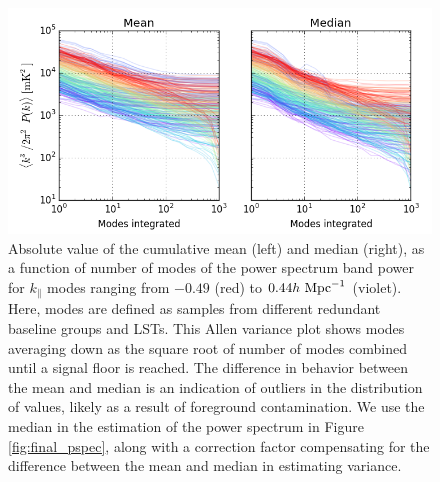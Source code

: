 \documentclass[twocolumn,numberedappendix]{emulateapj} \shorttitle{New Limits on the 21 cm Power Spectrum at $z=8.4$}
\newcommand{\hMpci}{h\ {\rm Mpc}^{-1}}
\begin{document}
\begin{figure}\centering
\includegraphics[width=1.8\columnwidth]{plots/pspec_variance.png}
\caption{
Absolute value of the cumulative mean (left) and median (right), as a function of number of modes 
of the power spectrum band power for
$k_\parallel$ modes ranging from $-0.49$ (red) to $0.44\hMpci$ (violet).
Here, modes are defined as samples from different redundant baseline groups and LSTs.
This Allen variance plot shows modes averaging down as the square root of
number of modes combined until a signal floor is reached.  The difference in
behavior between the mean and median is an indication of outliers
in the distribution of values, likely as a result of foreground contamination.
We use the median in the estimation of the power spectrum in Figure \ref{fig:final_pspec},
along with a correction factor compensating for the difference between the mean and median
in estimating variance.
}\label{fig:pspec_variance}
\end{figure}
\end{document}
